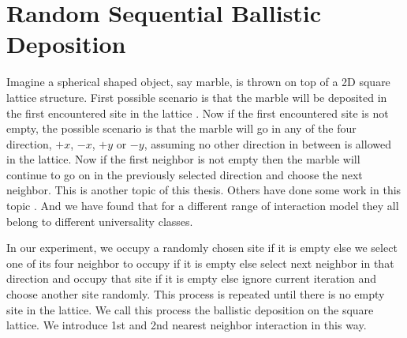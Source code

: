 		
		



\section{Random Sequential Ballistic Deposition}
	Imagine a spherical shaped object, say marble, is thrown on top of a 2D square lattice structure. First possible scenario is that the marble will be deposited in the first encountered site in the lattice . Now if the first encountered site is not empty, the possible scenario is that the marble will go in any of the four direction, $+x$, $-x$, $+y$ or $-y$, assuming no other direction in between is allowed in the lattice.  Now if the first neighbor is not empty then the marble will continue to go on in the previously selected direction and choose the next neighbor. This is another topic of this thesis. Others have done some work in this topic \cite{Choi1995, Talbot1992, Jullien1992, Viot1993}. And we have found that for a different range of interaction model they all belong to different universality classes.
	
	
	In our experiment, we occupy a randomly chosen site if it is empty else we select one of its four neighbor to occupy if it is empty else select next neighbor in that direction and occupy that site if it is empty else ignore current iteration and choose another site randomly. This process is repeated until there is no empty site in the lattice. We call this process the ballistic deposition on the square lattice. We introduce 1st and 2nd nearest neighbor interaction in this way.

